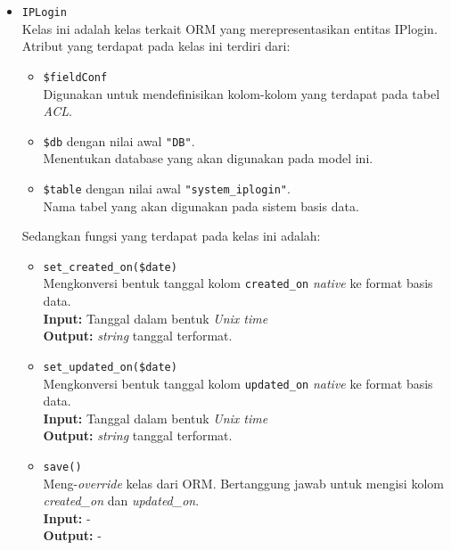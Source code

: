 \begin{itemize}
        \item \texttt{IPLogin} \\
            Kelas ini adalah kelas terkait ORM yang merepresentasikan entitas
            IPlogin. Atribut yang terdapat pada kelas ini terdiri dari:
            \begin{itemize}
                \item \texttt{\$fieldConf} \\
                    Digunakan untuk mendefinisikan kolom-kolom yang terdapat
                    pada tabel \textit{ACL}.
                \item \texttt{\$db} dengan nilai awal \texttt{"DB"}. \\
                    Menentukan database yang akan digunakan pada model ini.
                \item \texttt{\$table} dengan nilai awal
                \texttt{"system\_iplogin"}. \\
                    Nama tabel yang akan digunakan pada sistem basis data. 
            \end{itemize}
            Sedangkan fungsi yang terdapat pada kelas ini adalah:
            \begin{itemize}
                \item \texttt{set\_created\_on(\$date)} \\
                    Mengkonversi bentuk tanggal kolom \texttt{created\_on}
                    \textit{native} ke format basis data. \\
                    \textbf{Input:} Tanggal dalam bentuk \textit{Unix time}\\
                    \textbf{Output:} \textit{string} tanggal terformat.
                
                \item \texttt{set\_updated\_on(\$date)} \\
                    Mengkonversi bentuk tanggal kolom \texttt{updated\_on}
                    \textit{native} ke format basis data. \\
                    \textbf{Input:} Tanggal dalam bentuk \textit{Unix time}\\
                    \textbf{Output:} \textit{string} tanggal terformat.
                
                \item \texttt{save()}\\
                    Meng-\textit{override} kelas dari ORM. Bertanggung jawab
                    untuk mengisi kolom \textit{created\_on} dan
                    \textit{updated\_on}.\\
                    \textbf{Input:} -\\
                    \textbf{Output:} -
            \end{itemize}
    \end{itemize}
    
